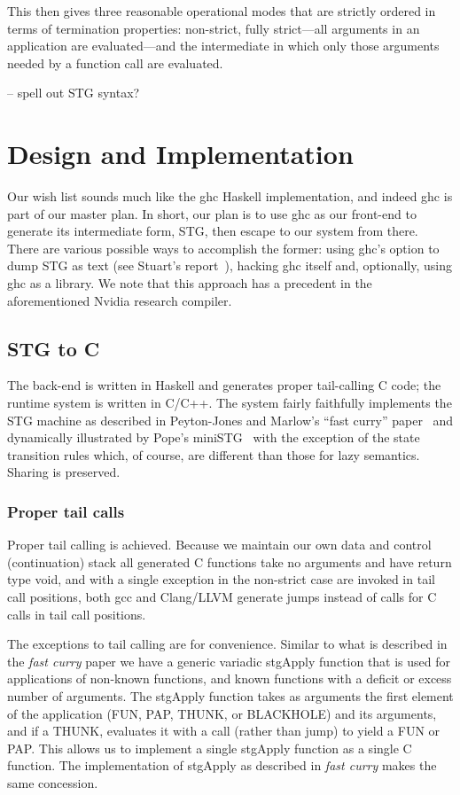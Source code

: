 \documentclass{llncs}
\begin{document}
This then gives three reasonable operational modes that are strictly ordered
in terms of termination properties: non-strict, fully strict---all arguments
in an application are evaluated---and the intermediate in which only those
arguments needed by a function call are evaluated.



-- spell out STG syntax?

\section{Design and Implementation}

Our wish list sounds much like the ghc Haskell implementation, and indeed ghc
is part of our master plan.  In short, our plan is to use ghc as our front-end
to generate its intermediate form, STG, then escape to our system from there.
There are various possible ways to accomplish the former: using ghc's option
to dump STG as text (see Stuart's report~\cite{Stuart}), hacking ghc itself
and, optionally, using ghc as a library.  We note that this approach has 
a precedent in the aforementioned Nvidia research compiler.

\subsection{STG to C}

The back-end is written in Haskell and generates proper tail-calling C code;
the runtime system is written in C/C++.  The system fairly faithfully
implements the STG machine as described in Peyton-Jones and Marlow's ``fast
curry'' paper~\cite{fastcurry} and dynamically illustrated by Pope's
miniSTG~\cite{ministg} with the exception of the state transition rules which,
of course, are different than those for lazy semantics.  Sharing is preserved.

\subsubsection{Proper tail calls}

Proper tail calling is achieved.  Because we maintain our own data and control
(continuation) stack all generated C functions take no arguments and have
return type void, and with a single exception in the non-strict case are
invoked in tail call positions, both gcc and Clang/LLVM generate jumps instead
of calls for C calls in tail call positions.

The exceptions to tail calling are for convenience.  Similar to what is
described in the \emph{fast curry} paper we have a generic variadic stgApply
function that is used for applications of non-known functions, and known
functions with a deficit or excess number of arguments.  The stgApply function
takes as arguments the first element of the application (FUN, PAP, THUNK, or
BLACKHOLE) and its arguments, and if a THUNK, evaluates it with a call (rather
than jump) to yield a FUN or PAP.  This allows us to implement a single
stgApply function as a single C function.  The implementation of stgApply as
described in \emph{fast curry} makes the same concession.
\end{document}
